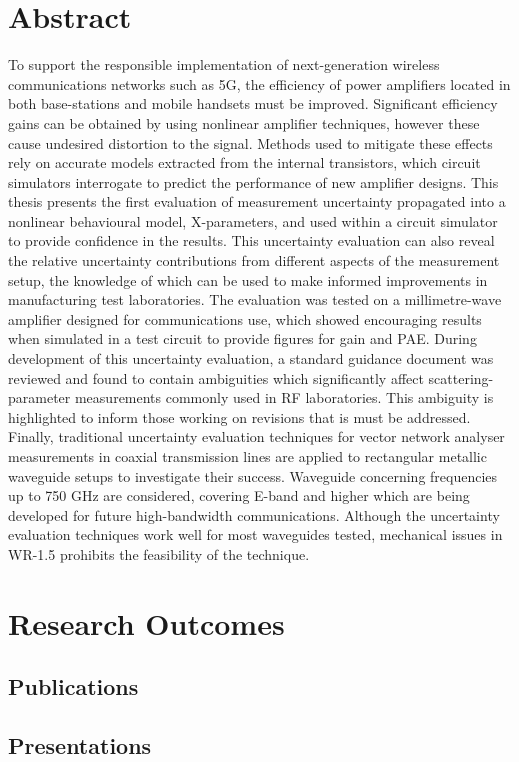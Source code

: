 \documentclass[../thesis/thesis.tex]{subfiles}
\begin{document}
\chapter*{Abstract}
\renewcommand{\baselinestretch}{1.5}\selectfont
To support the responsible implementation of next-generation wireless communications networks such as 5G, the efficiency of power amplifiers located in both base-stations and mobile handsets must be improved. Significant efficiency gains can be obtained by using nonlinear amplifier techniques, however these cause undesired distortion to the signal. Methods used to mitigate these effects rely on accurate models extracted from the internal transistors, which circuit simulators interrogate to predict the performance of new amplifier designs. This thesis presents the first evaluation of measurement uncertainty propagated into a nonlinear behavioural model, X-parameters, and used within a circuit simulator to provide confidence in the results. This uncertainty evaluation can also reveal the relative uncertainty contributions from different aspects of the measurement setup, the knowledge of which can be used to make informed improvements in manufacturing test laboratories. The evaluation was tested on a millimetre-wave amplifier designed for communications use, which showed encouraging results when simulated in a test circuit to provide figures for gain and PAE. During development of this uncertainty evaluation, a standard guidance document was reviewed and found to contain ambiguities which significantly affect scattering-parameter measurements commonly used in RF laboratories. This ambiguity is highlighted to inform those working on revisions that is must be addressed. Finally, traditional uncertainty evaluation techniques for vector network analyser measurements in coaxial transmission lines are applied to rectangular metallic waveguide setups to investigate their success. Waveguide concerning frequencies up to 750 GHz are considered, covering E-band and higher which are being developed for future high-bandwidth communications. Although the uncertainty evaluation techniques work well for most waveguides tested, mechanical issues in WR-1.5 prohibits the feasibility of the technique.

\renewcommand{\baselinestretch}{1}\selectfont
\chapter*{Research Outcomes}
\begin{refsection}
\section*{Publications}
\nocite{Votsi_2020, Salter_2018, Stant_2018_TMTT, Stant_2017, Stant_2016, Stant_2016_Coll}
\printbibliography[heading=none]
\end{refsection}
\begin{refsection}
\section*{Presentations}
\nocite{Stant_2017_pgi, Stant_2017_feps, Stant_2016_pg, Stant_2016_Coll2}
\printbibliography[heading=none]
\end{refsection}
\end{document}
